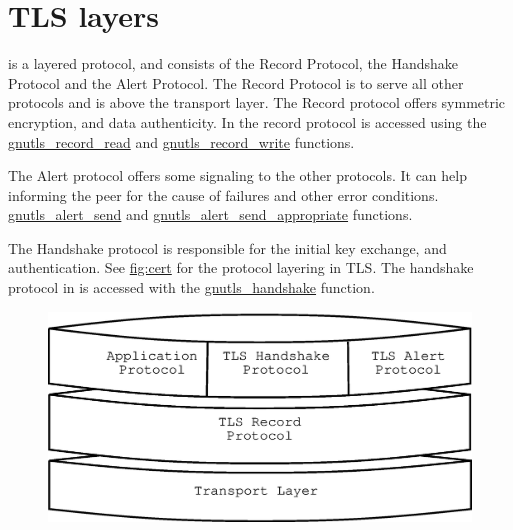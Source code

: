 \newpage
\section{TLS layers}

\tlsI{} is a layered protocol, and consists of the Record Protocol,
the Handshake Protocol and the Alert Protocol. The Record Protocol
is to serve all other protocols and is above the transport layer.
The Record protocol offers symmetric encryption, and data authenticity.
In \gnutls{} the record protocol is accessed using the 
\hyperref{gnutls\_record\_read()}{gnutls\_record\_read() (see Section }{)}{gnutls_record_read} and
\hyperref{gnutls\_record\_write()}{gnutls\_record\_write() (see Section }{)}{gnutls_record_write}
functions.

\par
The Alert protocol offers some signaling to the other protocols. It can
help informing the peer for the cause of failures and other error
conditions.
\hyperref{gnutls\_alert\_send()}{gnutls\_alert\_send() (see Section }{)}{gnutls_alert_send} and
\hyperref{gnutls\_alert\_send\_appropriate()}{gnutls\_alert\_send\_appropriate() (see Section }{)}{gnutls_alert_send_appropriate} 
functions.

\par 
The Handshake protocol is responsible for the initial key exchange,
and authentication. See \hyperref{figure}{figure }{}{fig:cert} for the
protocol layering in TLS. The handshake protocol in \gnutls{} is accessed
with the 
\hyperref{gnutls\_handshake()}{gnutls\_handshake() (see Section }{)}{gnutls_handshake} function.

\begin{figure}[hbtp]
\includegraphics{layers}
\label{fig:layers}

\end{figure}


\addvspace{1.5cm}

